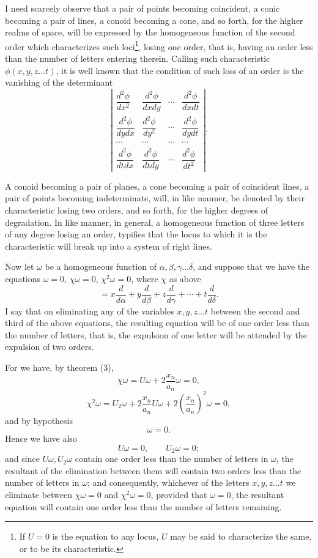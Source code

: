 \documentclass[11pt]{article}
\newcommand{\sourcepage}[1]{\marginpar{\scriptsize p.~#1}}
\begin{document}
{{\sourcepage{171}
I need scarcely observe that a pair of points becoming coincident, a conic becoming a pair of lines, a conoid becoming a cone, and so forth, for the higher realms of space, will be expressed by the homogeneous function of the second order which characterizes such loci\footnote{If $U=0$ is the equation to any locus, $U$ may be said to characterize the same, or to be its characteristic.}, losing one order, that is, having an order less than the number of letters entering therein. Calling such characteristic $\phi(x,y,z\ldots t)$, it is well known that the condition of such loss of an order is the vanishing of the determinant
\[
\left|
\begin{array}{cccc}
\dfrac{d^2\phi}{dx^2}&\dfrac{d^2\phi}{dxdy}&\cdots&\dfrac{d^2\phi}{dxdt}\\[0.7em]
\dfrac{d^2\phi}{dydx}&\dfrac{d^2\phi}{dy^2}&\cdots&\dfrac{d^2\phi}{dydt}\\[0.7em]
\cdots&\cdots&\cdots&\cdots\\[0.3em]
\dfrac{d^2\phi}{dtdx}&\dfrac{d^2\phi}{dtdy}&\cdots&\dfrac{d^2\phi}{dt^2}
\end{array}
\right|.
\]

A conoid becoming a pair of planes, a cone becoming a pair of coincident lines, a pair of points becoming indeterminate, will, in like manner, be denoted by their characteristic losing two orders, and so forth, for the higher degrees of degradation. In like manner, in general, a homogeneous function of three letters of any degree losing an order, typifies that the locus to which it is the characteristic will break up into a system of right lines.

Now let $\omega$ be a homogeneous function of $\alpha,\beta,\gamma\ldots\delta$, and suppose that we have the equations $\omega=0$, $\chi\omega=0$, $\chi^2\omega=0$, where $\chi$ as above
\[
 =x\frac{d}{d\alpha}+y\frac{d}{d\beta}+z\frac{d}{d\gamma}+\cdots+t\frac{d}{d\delta}.
\]
I say that on eliminating any of the variables $x,y,z\ldots t$ between the second and third of the above equations, the resulting equation will be of one order less than the number of letters, that is, the expulsion of one letter will be attended by the expulsion of two orders.

For we have, by theorem (3),
\[
 \chi\omega=U\omega+2\frac{x_n}{a_n}\omega=0,
\]
\[
 \chi^2\omega=U_2\omega+2\frac{x_n}{a_n}U\omega+2\left(\frac{x_n}{a_n}\right)^2\omega=0,
\]
and by hypothesis
\[
 \omega=0.
\]
Hence we have also
\[
 U\omega=0,
 \qquad
 U_2\omega=0;
\]
and since $U\omega,U_2\omega$ contain one order less than the number of letters in \sourcepage{172} $\omega$, the resultant of the elimination between them will contain two orders less than the number of letters in $\omega$; and consequently, whichever of the letters $x,y,z\ldots t$ we eliminate between $\chi\omega=0$ and $\chi^2\omega=0$, provided that $\omega=0$, the resultant equation will contain one order less than the number of letters remaining.

}}
\end{document}
